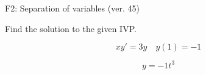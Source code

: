 \begin{exercise}
  \begin{exerciseTitle}F2: Separation of variables (ver. 45)\end{exerciseTitle}
  \begin{exerciseStatement}
    
Find the solution to the given IVP.

    
\[xy'= 3 y \hspace{1em} y( 1 ) = -1\]

  \end{exerciseStatement}
  \begin{exerciseAnswer}
    
\[y= -1 t^ 3\]

  \end{exerciseAnswer}
\end{exercise}